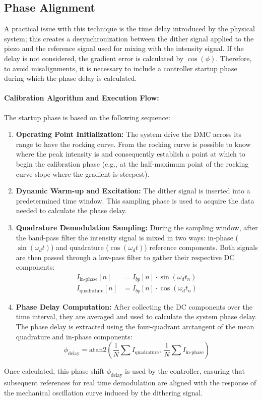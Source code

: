 \subsection{Phase Alignment}
A practical issue with this technique is the time delay introduced by the physical system; this creates a desynchronization between the dither signal applied to the piezo and the reference signal used for mixing with the intensity signal.
If the delay is not considered, the gradient error is calculated by $\cos(\phi)$. 
Therefore, to avoid misalignments, it is necessary to include a controller startup phase during which the phase delay is calculated.

\paragraph{Calibration Algorithm and Execution Flow:}
The startup phase is based on the following sequence:
\begin{enumerate}
    \item \textbf{Operating Point Initialization:} The system drive the DMC across its range to have the rocking curve.
    From the rocking curve is possible to know where the peak intensity is and consequently establish a point at which to begin the calibration phase (e.g., at the half-maximum point of the rocking curve slope where the gradient is steepest).
    \item \textbf{Dynamic Warm-up and Excitation:} The dither signal is inserted into a predetermined time window. This sampling phase is used to acquire the data needed to calculate the phase delay.
    \item \textbf{Quadrature Demodulation Sampling:} During the sampling window, after the band-pass filter the intensity signal is mixed in two ways: in-phase ($\sin(\omega_d t)$) and quadrature ($\cos(\omega_d t)$) reference components. Both signals are then passed through a low-pass filter to gather their respective DC components: 
    \begin{align}
        I_{\text{in-phase}}[n] &= I_{bp}[n] \cdot \sin(\omega_d t_n) \\
        I_{\text{quadrature}}[n] &= I_{bp}[n] \cdot \cos(\omega_d t_n)
    \end{align}
    \item \textbf{Phase Delay Computation:} After collecting the DC components over the time interval, they are averaged and used to calculate the system phase delay.
    The phase delay is extracted using the four-quadrant arctangent of the mean quadrature and in-phase components:
    \begin{equation}
        \phi_{\text{delay}} = \text{atan2}\left( \frac{1}{N}\sum I_{\text{quadrature}}, \, \frac{1}{N}\sum I_{\text{in-phase}} \right)
    \end{equation}
\end{enumerate}

Once calculated, this phase shift $\phi_{\text{delay}}$ is used by the controller, ensuring that subsequent references for real time demodulation are aligned with the response of the mechanical oscillation curve induced by the dithering signal.